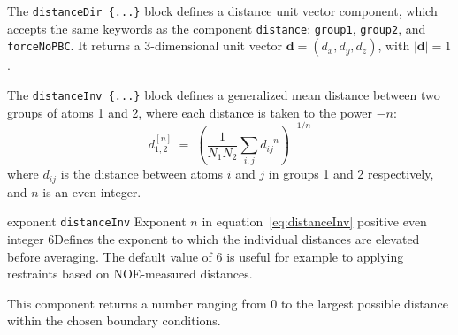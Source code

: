 
The \texttt{distanceDir~\{...\}} block defines
a distance unit vector component, which accepts the same keywords as
the component \texttt{distance}: \texttt{group1}, \texttt{group2}, and
\texttt{forceNoPBC}.  It returns a
3-dimensional unit vector $\mathbf{d} = (d_{x}, d_{y}, d_{z})$, with
$|\mathbf{d}| = 1$.

\begin{cvcoptions}
\item %
\item %
\item %
\end{cvcoptions}



The \texttt{distanceInv~\{...\}} block defines a generalized mean distance between two groups of atoms 1 and 2,
where each distance is taken to the power $-n$:
\begin{equation}
  \label{eq:distanceInv}
  d_{\mathrm{1,2}}^{[n]} \; = \;   \left(\frac{1}{N_{\mathrm{1}}N_{\mathrm{2}}}\sum_{i,j} d_{ij}^{-n} \right)^{-1/n}
\end{equation}
where $d_{ij}$ is the distance between atoms $i$ and $j$ in groups 1 and 2 respectively, and $n$ is an even integer.

\begin{cvcoptions}
\item %
\item %
\item %
\item %
  \keydef
    {exponent}{%
    \texttt{distanceInv}}{%
    Exponent $n$ in equation~\ref{eq:distanceInv}}{%
    positive even integer}{%
    6}{Defines the exponent to which the individual distances are elevated before averaging.  The default value of 6 is useful for example to applying restraints based on NOE-measured distances.}
\end{cvcoptions}
This component returns a number ranging from $0$ to the largest possible distance within the chosen boundary conditions.


